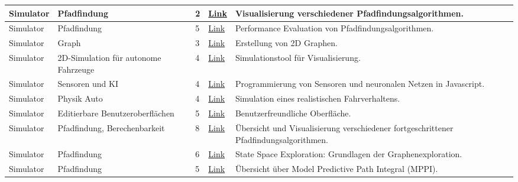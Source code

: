 \documentclass[../main.tex]{subfiles}
\begin{document}
\begin{longtable}{@{} L{2.5cm} L{2.9cm} C{1cm} L{1.2cm} L{6cm} @{}}
Simulator & Pfadfindung & 2 & \href{https://clementmihailescu.github.io/Pathfinding-Visualizer/\#}{Link} & Visualisierung verschiedener Pfadfindungsalgorithmen. \\
\hline
Simulator & Pfadfindung & 5 & \href{https://scholar.uwindsor.ca/cgi/viewcontent.cgi?article=9230\&context=etd}{Link} & Performance Evaluation von Pfadfindungsalgorithmen. \\
\hline
Simulator & Graph & 3 & \href{https://visjs.github.io/vis-network/examples/}{Link} & Erstellung von 2D Graphen. \\
\hline
Simulator & 2D-Simulation für autonome Fahrzeuge & 4 & \href{https://docs.unity3d.com/Simulation/manual/author/create-a-vehicle-model.html}{Link} & Simulationstool für Visualisierung. \\
\hline
Simulator & Sensoren und KI & 4 & \href{https://medium.com/@krish.bhoopati556/coding-the-road-ahead-self-driving-cars-with-javascript-and-ai-1995ecb2c1ec}{Link} & Programmierung von Sensoren und neuronalen Netzen in Javascript. \\
\hline
Simulator & Physik Auto & 4 & \href{https://www.asawicki.info/Mirror/Car\%20Physics\%20for\%20Games/Car\%20Physics\%20for\%20Games.html}{Link} & Simulation eines realistischen Fahrverhaltens. \\
\hline
Simulator & Editierbare Benutzeroberflächen & 5 & \href{https://github.com/tpan496/csgraph\_editor}{Link} & Benutzerfreundliche Oberfläche. \\
\hline
Simulator & Pfadfindung, Berechenbarkeit & 8 & \href{https://moribots.github.io/project/motion-planning}{Link} & Übersicht und Visualisierung verschiedener fortgeschrittener Pfadfindungsalgorithmen. \\
\hline
Simulator & Pfadfindung & 6 & \href{https://www.mcrl2.org/web/\_downloads/08c5ec296da673df304284f04f0e815a/state-space-exploration.pdf}{Link} & State Space Exploration: Grundlagen der Graphenexploration. \\
\hline
Simulator & Pfadfindung & 5 & \href{https://sites.gatech.edu/acds/mppi/}{Link} & Übersicht über Model Predictive Path Integral (MPPI). \\


\end{longtable}
\end{document}
